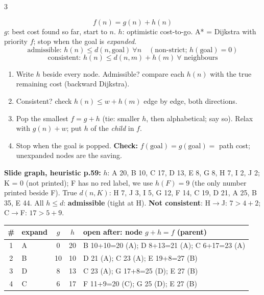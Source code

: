 \begin{multicols}{3}
\begin{fbx}[A*]
\[f(n)=g(n)+h(n)\]
$g$: best cost found so far, start to $n$. $h$: optimistic cost-to-go. A* = Dijkstra with priority $f$; stop when the goal is \emph{expanded}.
\[\text{admissible: }h(n)\le d(n,\text{goal})\ \forall n\quad(\text{non-strict; }h(\text{goal})=0)\]
\[\text{consistent: }h(n)\le d(n,m)+h(m)\ \forall\text{ neighbours}\]
\end{fbx}
\begin{recipe}
\begin{enumerate}
\item Write $h$ beside every node. Admissible? compare each $h(n)$ with the true remaining cost (backward Dijkstra).
\item Consistent? check $h(n)\le w+h(m)$ edge by edge, both directions.
\item Pop the smallest $f=g+h$ (tie: smaller $h$, then alphabetical; say so). Relax with $g(n)+w$; put $h$ of the \emph{child} in $f$.
\item Stop when the goal is popped. \textbf{Check:} $f(\text{goal})=g(\text{goal})=$ path cost; unexpanded nodes are the saving.
\end{enumerate}
\end{recipe}
\textbf{Slide graph, heuristic p.59:} $h$: A 20, B 10, C 17, D 13, E 8, G 8, H 7, I 2, J 2; K = 0 (not printed); F has no red label, we use $h(F)=9$ (the only number printed beside F). True $d(n,K)$: H 7, J 3, I 5, G 12, F 14, C 19, D 21, A 25, B 35, E 44. All $h\le d$: \textbf{admissible} (tight at H). \textbf{Not consistent}: H$\to$J: $7>4+2$; C$\to$F: $17>5+9$.
\begin{worked}
\footnotesize\setlength{\tabcolsep}{2pt}
\begin{tabularx}{\linewidth}{@{}clccX@{}}\toprule
\# & expand & $g$ & $h$ & open after: node $g{+}h{=}f$ (parent)\\\midrule
1&A&0&20& B 10+10=20 (A); D 8+13=21 (A); C 6+17=23 (A)\\
2&B&10&10& D 21 (A); C 23 (A); E 19+8=27 (B)\\
3&D&8&13& C 23 (A); G 17+8=25 (D); E 27 (B)\\
4&C&6&17& F 11+9=20 (C); G 25 (D); E 27 (B)\\

\end{tabularx}
\end{worked}
\end{multicols}
